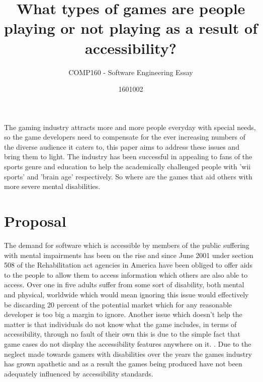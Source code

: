\documentclass{scrartcl}
\title{What types of games are people playing or not playing as a result of accessibility?}
\subtitle{COMP160 - Software Engineering Essay}
\author{1601002}
\begin{document}
\maketitle

The gaming industry attracts more and more people everyday with special needs, so the game developers need to compensate for the ever increasing numbers of the diverse audience it caters to, this paper aims to address these issues and bring them to light. The industry has been successful in appealing to fans of the sports genre and education to help the academically challenged people with 'wii sports' and 'brain age' respectively. So where are the games that aid others with more severe mental disabilities.

\section{Proposal}
The demand for software which is accessible by members of the public suffering with mental impairments has been on the rise and since June 2001 under section 508 of the Rehabilitation act \cite{cohen2005accessibility} agencies in America have been obliged to offer aids to the people to allow them to access information which others are also able to access. Over one in five adults suffer from some sort of disability, both mental and physical, worldwide \cite{sierkowski2002achieving} which would mean ignoring this issue would effectively be discarding 20 percent of the potential market which for any reasonable developer is too big a margin to ignore.  Another issue which doesn't help the matter is that individuals do not know what the game includes, in terms of accessibility, through no fault of their own this is due to the simple fact that game cases do not display the accessibility features anywhere on it. \cite {bierre2005game}. Due to the neglect made towards gamers with disabilities over the years the games industry has grown apathetic and as a result the games being produced have not been adequately influenced by accessibility standards.\cite{porter2013empirical}




\end{document}
